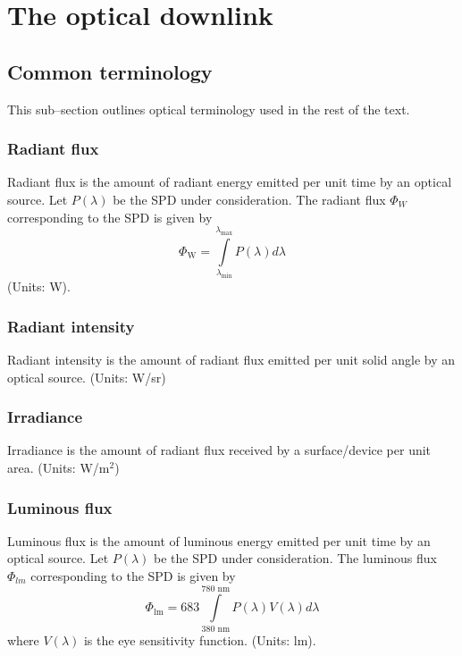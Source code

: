 \section{The optical downlink}
\label{sec:outline}
\graphicspath{{_Intro/Figures/}}

\subsection{Common terminology}
\label{subsec:outlineTerminology}
This sub--section outlines optical terminology used in the rest of the text.
\subsubsection{Radiant flux}
\label{subsubsec:radiantFlux}
Radiant flux is the amount of radiant energy emitted per unit time by an optical source. Let $P(\lambda)$ be the SPD under consideration. The radiant flux $\Phi_{W}$ corresponding to the SPD is given by 
\begin{equation}
	\Phi_{\text{W}} = \int\limits_{\lambda_{\text{min}}}^{\lambda_{\text{max}}}P(\lambda)d\lambda
	\label{eqRadiantFlux}
\end{equation}
(Units: W).

\subsubsection{Radiant intensity}
\label{subsubsec:radiantIntensity}
Radiant intensity is the amount of radiant flux emitted per unit solid angle by an optical source. (Units: W/sr)

\subsubsection{Irradiance}
\label{subsubsec:irradiance}
Irradiance is the amount of radiant flux received by a surface/device per unit area. (Units: W/m$^{2}$)

\subsubsection{Luminous flux}
\label{subsubsec:luminousFlux}
Luminous flux is the amount of luminous energy emitted per unit time by an optical source. Let $P(\lambda)$ be the SPD under consideration. The luminous flux $\Phi_{lm}$ corresponding to the SPD is given by \cite{gru08b}
\begin{equation}
	\Phi_{\text{lm}} = 683\int\limits_{380\text{ nm}}^{780\text{ nm}}P(\lambda)V(\lambda)d\lambda
	\label{eqLuminousFlux}
\end{equation}
where $V(\lambda)$ is the eye sensitivity function. (Units: lm).

